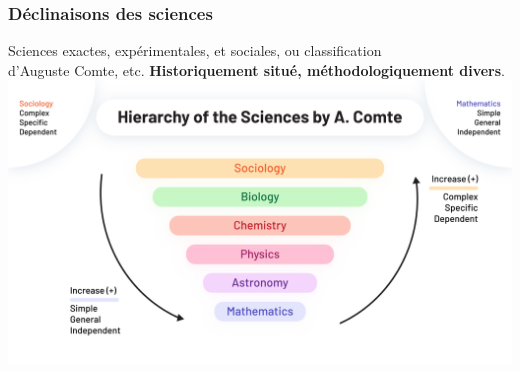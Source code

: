 \documentclass[xcolor=dvipsnames]{beamer}
\begin{document}
	\begin{frame}
		\frametitle{Déclinaisons des sciences}
		Sciences exactes, expérimentales, et sociales, ou classification\\d'Auguste Comte, etc. \textbf{Historiquement situé, méthodologiquement divers}.
		\includegraphics[scale=0.25]{Sciences.PNG}
	\end{frame}
	
\end{document}
